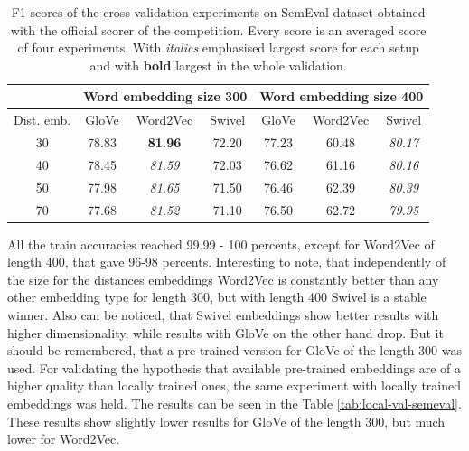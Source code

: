 \begin{table}
        \centering
        \begin{tabular}{|c|c|c|c|c|c|c|}
          \hline
            & \multicolumn{3}{|c|}{Word embedding size 300} & \multicolumn{3}{|c|}{Word embedding size 400} \\\hline
            Dist. emb. & GloVe & Word2Vec & Swivel & GloVe & Word2Vec & Swivel  \\\hline
            \multicolumn{1}{|c|}{30} & 78.83 & \textbf{81.96} & 72.20 & 77.23 & 60.48 & \textit{80.17} \\\hline
            \multicolumn{1}{|c|}{40} & 78.45 & \textit{81.59} & 72.03 & 76.62 & 61.16 & \textit{80.16} \\\hline
            \multicolumn{1}{|c|}{50} & 77.98 & \textit{81.65} & 71.50 & 76.46 & 62.39 & \textit{80.39} \\\hline
            \multicolumn{1}{|c|}{70} & 77.68 & \textit{81.52} & 71.10 & 76.50 & 62.72 & \textit{79.95} \\\hline
        \end{tabular}
        \caption[Cross-validation for the general domain]{F1-scores of the cross-validation experiments on SemEval dataset obtained with the official scorer of the competition. Every score is an averaged score of four experiments. With \textit{italics} emphasised largest score for each setup and with \textbf{bold} largest in the whole validation.}
        \label{tab:val-semeval}
    \end{table}

All the train accuracies reached 99.99 - 100 percents, except for Word2Vec of length 400, that gave 96-98 percents. Interesting to note, that independently of the size for the distances embeddings Word2Vec is constantly better than any other embedding type for length 300, but with length 400 Swivel is a stable winner.  Also can be noticed, that Swivel embeddings show better results with higher dimensionality, while results with GloVe on the other hand drop. But it should be remembered, that a pre-trained version for GloVe of the length 300 was used. For validating the hypothesis that available pre-trained embeddings are of a higher quality than locally trained ones, the same experiment with locally trained embeddings was held. The results can be seen in the Table \ref{tab:local-val-semeval}. These results show slightly lower results for GloVe of the length 300, but much lower for Word2Vec.

